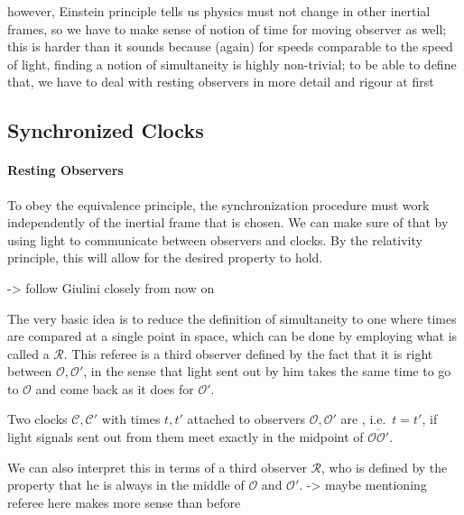 however, Einstein principle tells us physics must not change in other inertial frames, so we have to make sense of notion of time for moving observer as well; this is harder than it sounds because (again) for speeds comparable to the speed of light, finding a notion of simultaneity is highly non-trivial; to be able to define that, we have to deal with resting observers in more detail and rigour at first



		\subsection{Synchronized Clocks}
			\paragraph{Resting Observers}
To obey the equivalence principle, the synchronization procedure must work independently of the inertial frame that is chosen. We can make sure of that by using light to communicate between observers and clocks. By the relativity principle, this will allow for the desired property to hold.


-> follow Giulini closely from now on


The very basic idea is to reduce the definition of simultaneity to one where times are compared at a single point in space, which can be done by employing what is called a  $\mathcal{R}$. This referee is a third observer defined by the fact that it is right between $\mathcal{O}, \mathcal{O}'$, in the sense that light sent out by him takes the same time to go to $\mathcal{O}$ and come back as it does for $\mathcal{O}'$.


\begin{defi}[Einstein Synchronization]
Two clocks $\mathcal{C}, \mathcal{C}'$ with times $t, t'$ attached to observers $\mathcal{O}, \mathcal{O}'$ are , i.e.~$t = t'$, if light signals sent out from them meet exactly in the midpoint of $\overline{\mathcal{O} \mathcal{O}'}$.
\end{defi}
We can also interpret this in terms of a third observer $\mathcal{R}$, who is defined by the property that he is always in the middle of $\mathcal{O}$ and $\mathcal{O}'$.
-> maybe mentioning referee here makes more sense than before

